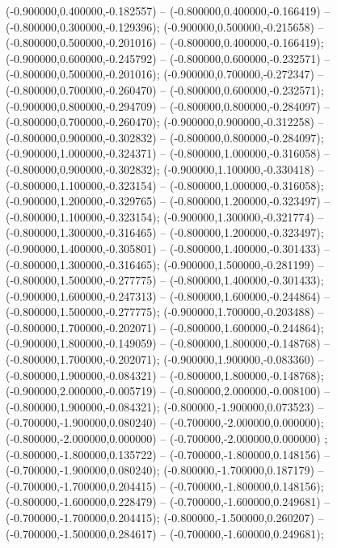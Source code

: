  (-0.900000,0.400000,-0.182557) -- (-0.800000,0.400000,-0.166419) -- (-0.800000,0.300000,-0.129396);
 (-0.900000,0.500000,-0.215658) -- (-0.800000,0.500000,-0.201016) -- (-0.800000,0.400000,-0.166419);
 (-0.900000,0.600000,-0.245792) -- (-0.800000,0.600000,-0.232571) -- (-0.800000,0.500000,-0.201016);
 (-0.900000,0.700000,-0.272347) -- (-0.800000,0.700000,-0.260470) -- (-0.800000,0.600000,-0.232571);
 (-0.900000,0.800000,-0.294709) -- (-0.800000,0.800000,-0.284097) -- (-0.800000,0.700000,-0.260470);
 (-0.900000,0.900000,-0.312258) -- (-0.800000,0.900000,-0.302832) -- (-0.800000,0.800000,-0.284097);
 (-0.900000,1.000000,-0.324371) -- (-0.800000,1.000000,-0.316058) -- (-0.800000,0.900000,-0.302832);
 (-0.900000,1.100000,-0.330418) -- (-0.800000,1.100000,-0.323154) -- (-0.800000,1.000000,-0.316058);
 (-0.900000,1.200000,-0.329765) -- (-0.800000,1.200000,-0.323497) -- (-0.800000,1.100000,-0.323154);
 (-0.900000,1.300000,-0.321774) -- (-0.800000,1.300000,-0.316465) -- (-0.800000,1.200000,-0.323497);
 (-0.900000,1.400000,-0.305801) -- (-0.800000,1.400000,-0.301433) -- (-0.800000,1.300000,-0.316465);
 (-0.900000,1.500000,-0.281199) -- (-0.800000,1.500000,-0.277775) -- (-0.800000,1.400000,-0.301433);
 (-0.900000,1.600000,-0.247313) -- (-0.800000,1.600000,-0.244864) -- (-0.800000,1.500000,-0.277775);
 (-0.900000,1.700000,-0.203488) -- (-0.800000,1.700000,-0.202071) -- (-0.800000,1.600000,-0.244864);
 (-0.900000,1.800000,-0.149059) -- (-0.800000,1.800000,-0.148768) -- (-0.800000,1.700000,-0.202071);
 (-0.900000,1.900000,-0.083360) -- (-0.800000,1.900000,-0.084321) -- (-0.800000,1.800000,-0.148768);
 (-0.900000,2.000000,-0.005719) -- (-0.800000,2.000000,-0.008100) -- (-0.800000,1.900000,-0.084321);
 (-0.800000,-1.900000,0.073523) -- (-0.700000,-1.900000,0.080240) -- (-0.700000,-2.000000,0.000000);
 (-0.800000,-2.000000,0.000000) -- (-0.700000,-2.000000,0.000000) ;
 (-0.800000,-1.800000,0.135722) -- (-0.700000,-1.800000,0.148156) -- (-0.700000,-1.900000,0.080240);
 (-0.800000,-1.700000,0.187179) -- (-0.700000,-1.700000,0.204415) -- (-0.700000,-1.800000,0.148156);
 (-0.800000,-1.600000,0.228479) -- (-0.700000,-1.600000,0.249681) -- (-0.700000,-1.700000,0.204415);
 (-0.800000,-1.500000,0.260207) -- (-0.700000,-1.500000,0.284617) -- (-0.700000,-1.600000,0.249681);
